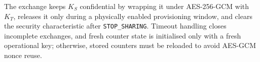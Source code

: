 \documentclass[journal]{IEEEtran}
\begin{document}


The exchange keeps $K_S$ confidential by wrapping it under AES-256-GCM with $K_T$, releases it only during a physically enabled provisioning window, and clears the security characteristic after \texttt{STOP\_SHARING}. Timeout handling closes incomplete exchanges, and fresh counter state is initialised only with a fresh operational key; otherwise, stored counters must be reloaded to avoid AES-GCM nonce reuse.
\end{document}
